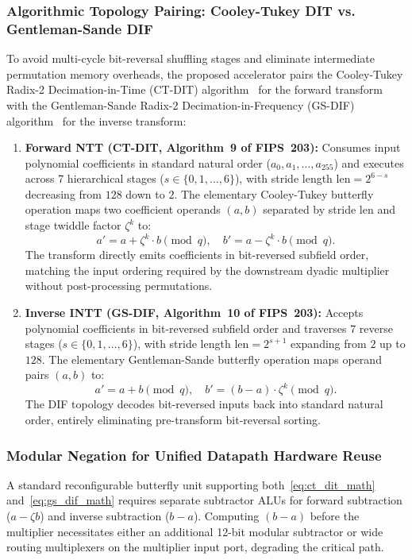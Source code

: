\subsubsection{Algorithmic Topology Pairing: Cooley-Tukey DIT vs. Gentleman-Sande DIF}
To avoid multi-cycle bit-reversal shuffling stages and eliminate intermediate permutation memory overheads, the proposed accelerator pairs the Cooley-Tukey Radix-2 Decimation-in-Time (CT-DIT) algorithm~\cite{cooley1965} for the forward transform with the Gentleman-Sande Radix-2 Decimation-in-Frequency (GS-DIF) algorithm~\cite{gentleman1966} for the inverse transform:

\begin{enumerate}
    \item \textbf{Forward NTT (CT-DIT, Algorithm~9 of FIPS~203):} Consumes input polynomial coefficients in standard natural order ($a_0, a_1, \dots, a_{255}$) and executes across 7 hierarchical stages ($s \in \{0, 1, \dots, 6\}$), with stride length $\text{len} = 2^{6-s}$ decreasing from $128$ down to $2$. The elementary Cooley-Tukey butterfly operation maps two coefficient operands $(a, b)$ separated by stride $\text{len}$ and stage twiddle factor $\zeta^k$ to:
    \begin{equation}
    \label{eq:ct_dit_math}
    a' = a + \zeta^k \cdot b \pmod q, \quad b' = a - \zeta^k \cdot b \pmod q.
    \end{equation}
    The transform directly emits coefficients in bit-reversed subfield order, matching the input ordering required by the downstream dyadic multiplier without post-processing permutations.
    
    \item \textbf{Inverse INTT (GS-DIF, Algorithm~10 of FIPS~203):} Accepts polynomial coefficients in bit-reversed subfield order and traverses 7 reverse stages ($s \in \{0, 1, \dots, 6\}$), with stride length $\text{len} = 2^{s+1}$ expanding from $2$ up to $128$. The elementary Gentleman-Sande butterfly operation maps operand pairs $(a, b)$ to:
    \begin{equation}
    \label{eq:gs_dif_math}
    a' = a + b \pmod q, \quad b' = (b - a) \cdot \zeta^k \pmod q.
    \end{equation}
    The DIF topology decodes bit-reversed inputs back into standard natural order, entirely eliminating pre-transform bit-reversal sorting.
\end{enumerate}

\subsubsection{Modular Negation for Unified Datapath Hardware Reuse}
\label{sec05a_modular_negation}
A standard reconfigurable butterfly unit supporting both~\eqref{eq:ct_dit_math} and~\eqref{eq:gs_dif_math} requires separate subtractor ALUs for forward subtraction ($a - \zeta b$) and inverse subtraction ($b - a$). Computing $(b - a)$ before the multiplier necessitates either an additional 12-bit modular subtractor or wide routing multiplexers on the multiplier input port, degrading the critical path.

